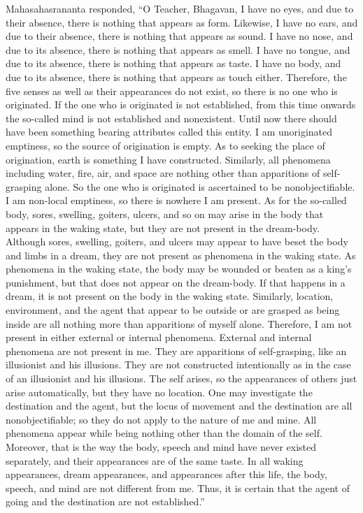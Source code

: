 \documentclass[a4paper,11pt,twoside,final]{book}
\begin{document}
Mahasahasrananta responded, ``O Teacher, Bhagavan, I have no eyes, and
due to their absence, there is nothing that appears as form. Likewise,
I have no ears, and due to their absence, there is nothing that
appears as sound. I have no nose, and due to its absence, there is
nothing that appears as smell. I have no tongue, and due to its
absence, there is nothing that appears as taste. I have no body, and
due to its absence, there is nothing that appears as touch either.
Therefore, the five senses as well as their appearances do not exist,
so there is no one who is originated. If the one who is originated is
not established, from this time onwards the so-called mind is not
established and nonexistent.  Until now there should have been
something bearing attributes called this entity. I am unoriginated
emptiness, so the source of origination is empty. As to seeking the
place of origination, earth is something I have
constructed. Similarly, all phenomena including water, fire, air, and
space are nothing other than apparitions of self-grasping alone. So
the one who is originated is ascertained to be nonobjectifiable.  I am
non-local emptiness, so there is nowhere I am present. As for the
so-called body, sores, swelling, goiters, ulcers, and so on may arise
in the body that appears in the waking state, but they are not present
in the dream-body.  Although sores, swelling, goiters, and ulcers may
appear to have beset the body and limbs in a dream, they are not
present as phenomena in the waking state. As phenomena in the waking
state, the body may be wounded or beaten as a king's punishment, but
that does not appear on the dream-body. If that happens in a dream, it
is not present on the body in the waking state. Similarly, location,
environment, and the agent that appear to be outside or are grasped as
being inside are all nothing more than apparitions of myself alone.
Therefore, I am not present in either external or internal
phenomena. External and internal phenomena are not present in me. They
are apparitions of self-grasping, like an illusionist and his
illusions. They are not constructed intentionally as in the case of an
illusionist and his illusions. The self arises, so the appearances of
others just arise automatically, but they have no location. One may
investigate the destination and the agent, but the locus of movement
and the destination are all nonobjectifiable; so they do not apply to
the nature of me and mine. All phenomena appear while being nothing
other than the domain of the self. Moreover, that is the way the body,
speech and mind have never existed separately, and their appearances
are of the same taste. In all waking appearances, dream appearances,
and appearances after this life, the body, speech, and mind are not
different from me. Thus, it is certain that the agent of going and the
destination are not established.''
\end{document}
